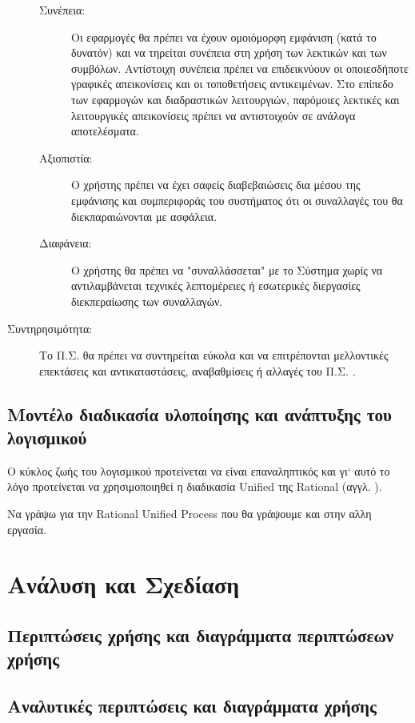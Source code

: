 \documentclass{assignment}
\begin{document}
\begin{description}
\begin{description}
	\item[Συνέπεια:] Οι εφαρμογές θα πρέπει να έχουν ομοιόμορφη εμφάνιση (κατά το δυνατόν) και να τηρείται συνέπεια στη χρήση των λεκτικών και των συμβόλων. Αντίστοιχη συνέπεια πρέπει να επιδεικνύουν οι οποιεσδήποτε γραφικές απεικονίσεις και οι τοποθετήσεις αντικειμένων. Στο επίπεδο των εφαρμογών και διαδραστικών λειτουργιών, παρόμοιες λεκτικές και λειτουργικές απεικονίσεις πρέπει να αντιστοιχούν σε ανάλογα αποτελέσματα.

	\item [Αξιοπιστία:] Ο χρήστης πρέπει να έχει σαφείς διαβεβαιώσεις δια μέσου της εμφάνισης και συμπεριφοράς του συστήματος ότι οι συναλλαγές του θα διεκπαραιώνονται με ασφάλεια.

	\item[Διαφάνεια:] Ο χρήστης θα πρέπει να "συναλλάσσεται" με το Σύστημα χωρίς να αντιλαμβάνεται τεχνικές λεπτομέρειες ή εσωτερικές διεργασίες διεκπεραίωσης των συναλλαγών.
\end{description}

\item[Συντηρησιμότητα:] Το Π.Σ. θα πρέπει να συντηρείται εύκολα και να επιτρέπονται μελλοντικές επεκτάσεις και αντικαταστάσεις, αναβαθμίσεις ή αλλαγές του Π.Σ. .

\end{description}


\subsection{Μοντέλο διαδικασία υλοποίησης και ανάπτυξης του λογισμικού}

Ο κύκλος ζωής του λογισμικού προτείνεται να είναι επαναληπτικός \cite{virvou_uml} και γι` αυτό το λόγο προτείνεται να χρησιμοποιηθεί η διαδικασία Unified της Rational (αγγλ. ).

Να γράψω για την Rational Unified Process που θα γράψουμε και στην αλλη εργασία.



\section{Ανάλυση και Σχεδίαση}

\subsection{Περιπτώσεις χρήσης και διαγράμματα περιπτώσεων χρήσης}
\subsection{Αναλυτικές περιπτώσεις και διαγράμματα χρήσης}
\end{document}
